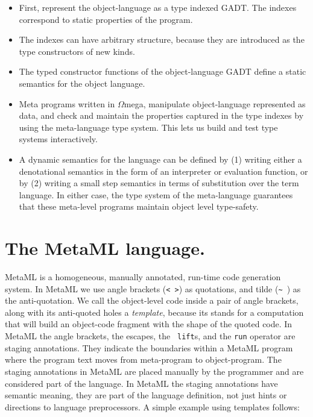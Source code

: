 \documentclass{sigplanconf}
\newcommand{\om}{$\Omega$mega}
\begin{document}
\begin{itemize}

\item First, represent the object-language as a type indexed GADT. The indexes
correspond to static properties of the program.

\item The indexes can have arbitrary structure, because they are introduced as
the type constructors of new kinds.

\item The typed constructor functions of the object-language GADT define a
static semantics for the object language.

\item Meta programs written in \om, manipulate object-language represented as
data, and check and maintain the properties captured in the type indexes
by using the meta-language type system. This lets us build and test type
systems interactively.

\item A dynamic semantics for the language can be defined by (1) writing either
a denotational semantics in the form of an interpreter or evaluation
function, or by (2) writing a small step semantics in terms of substitution
over the term language. In either case, the type system of the meta-language
guarantees that these meta-level programs maintain object level type-safety.

\end{itemize}

\section{The MetaML language.} \label{metaml}

MetaML is a homogeneous, manually annotated, run-time code generation system.
In MetaML we use angle brackets (\verb+< >+) as quotations, and tilde 
(\verb+~ +) as the anti-quotation. We call the object-level code inside a pair of
angle brackets, along with its anti-quoted holes a {\em template}, because its
stands for a computation that will build an object-code fragment with the
shape of the quoted code. In MetaML the angle brackets, the escapes, the {\tt
lift}s, and the {\tt run} operator are staging annotations. They indicate the
boundaries within a MetaML program where the program text moves from 
meta-program to object-program. The staging annotations in MetaML are placed
manually by the programmer and are considered part of the language. In MetaML
the staging annotations have semantic meaning, they are part of the language
definition, not just hints or directions to language preprocessors.
A simple example using templates follows:
\end{document}
